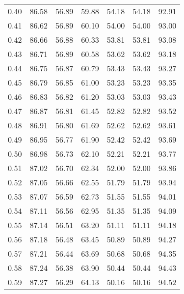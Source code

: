 \begin{tabular}{|c|c|c|c|c|c|c|}
      0.40 &     86.58 &     56.89 &      59.88 &   54.18 &      54.18 &         92.91 \\
      0.41 &     86.62 &     56.89 &      60.10 &   54.00 &      54.00 &         93.00 \\
      0.42 &     86.66 &     56.88 &      60.33 &   53.81 &      53.81 &         93.08 \\
      0.43 &     86.71 &     56.89 &      60.58 &   53.62 &      53.62 &         93.18 \\
      0.44 &     86.75 &     56.87 &      60.79 &   53.43 &      53.43 &         93.27 \\
      0.45 &     86.79 &     56.85 &      61.00 &   53.23 &      53.23 &         93.35 \\
      0.46 &     86.83 &     56.82 &      61.20 &   53.03 &      53.03 &         93.43 \\
      0.47 &     86.87 &     56.81 &      61.45 &   52.82 &      52.82 &         93.52 \\
      0.48 &     86.91 &     56.80 &      61.69 &   52.62 &      52.62 &         93.61 \\
      0.49 &     86.95 &     56.77 &      61.90 &   52.42 &      52.42 &         93.69 \\
      0.50 &     86.98 &     56.73 &      62.10 &   52.21 &      52.21 &         93.77 \\
      0.51 &     87.02 &     56.70 &      62.34 &   52.00 &      52.00 &         93.86 \\
      0.52 &     87.05 &     56.66 &      62.55 &   51.79 &      51.79 &         93.94 \\
      0.53 &     87.07 &     56.59 &      62.73 &   51.55 &      51.55 &         94.01 \\
      0.54 &     87.11 &     56.56 &      62.95 &   51.35 &      51.35 &         94.09 \\
      0.55 &     87.14 &     56.51 &      63.20 &   51.11 &      51.11 &         94.18 \\
      0.56 &     87.18 &     56.48 &      63.45 &   50.89 &      50.89 &         94.27 \\
      0.57 &     87.21 &     56.44 &      63.69 &   50.68 &      50.68 &         94.35 \\
      0.58 &     87.24 &     56.38 &      63.90 &   50.44 &      50.44 &         94.43 \\
      0.59 &     87.27 &     56.29 &      64.13 &   50.16 &      50.16 &         94.52 \\

\end{tabular}
